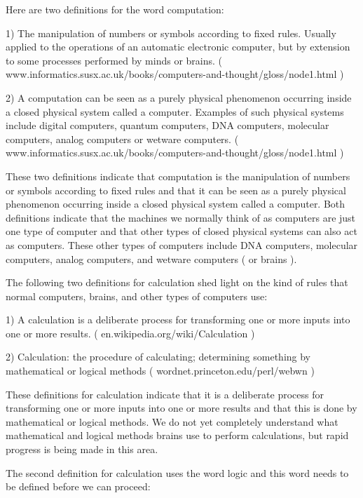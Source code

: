 \documentclass[12pt,oneside]{book}
\begin{document}
Here are two definitions for the word computation:


1) The manipulation of numbers or symbols according to fixed rules. Usually applied to the operations of an automatic electronic computer, but by extension to some processes performed by minds or brains. ( www.informatics.susx.ac.uk/books/computers{}-and{}-thought/gloss/node1.html ) 

2) A computation can be seen as a purely physical phenomenon occurring inside a closed physical system called a computer. Examples of such physical systems include digital computers, quantum computers, DNA computers, molecular computers, analog computers or wetware computers. ( www.informatics.susx.ac.uk/books/computers{}-and{}-thought/gloss/node1.html ) 


These two definitions indicate that computation is the {\textquotedbl}manipulation of numbers or symbols according to fixed rules{\textquotedbl} and that it {\textquotedbl}can be seen as a purely physical phenomenon occurring inside a closed physical system called a computer.{\textquotedbl} Both definitions indicate that the machines we normally think of as computers are just one type of computer and that other types of closed physical systems can also act as computers. These other types of computers include DNA computers, molecular computers, analog computers, and wetware computers ( or brains ). 

The following two definitions for calculation shed light on the kind of rules that normal computers, brains, and other types of computers use: 

1) A calculation is a deliberate process for transforming one or more inputs into one or more results. ( en.wikipedia.org/wiki/Calculation ) 

2) Calculation: the procedure of calculating; determining something by mathematical or logical methods ( wordnet.princeton.edu/perl/webwn ) 

These definitions for calculation indicate that it {\textquotedbl}is a deliberate process for transforming one or more inputs into one or more results{\textquotedbl} and that this is done {\textquotedbl}by mathematical or logical methods{\textquotedbl}. We do not yet completely understand what mathematical and logical methods brains use to perform calculations, but rapid progress is being made in this area. 

The second definition for calculation uses the word logic and this word needs to be defined before we can proceed: 
\end{document}
